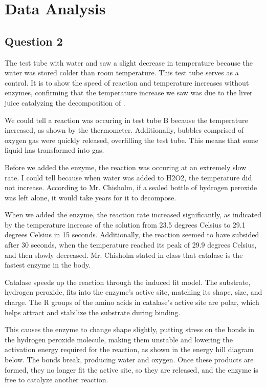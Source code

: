 \documentclass[12pt]{article}
\begin{document}
\section*{Data Analysis}

\subsection*{Question 2}
\begin{enumAlph}
    \item The test tube with water and  saw a slight decrease in temperature
    because the water was stored colder than room temperature. This test tube serves as a control. It is to show
    the speed of reaction and temperature increases without enzymes, 
    confirming that the temperature increase we saw
    was due to the liver juice catalyzing the decomposition of . 
    \item We could tell a reaction was occuring in test tube B 
    because the temperature increased, as shown by the thermometer.
    Additionally, bubbles comprised of oxygen gas were quickly released, overfilling
    the test tube. This means that some liquid has transformed into gas. 
    \item Before we added the enzyme, the reaction was occuring at 
    an extremely slow rate. I could tell because when water was added to H2O2, 
    the temperature did not increase. According to Mr. 
    Chisholm, if a sealed bottle of hydrogen peroxide was left alone,
    it would take years for it to decompose.
    \item When we added the enzyme, the
    reaction rate increased significantly, as indicated by the temperature increase of the solution from 
    23.5 degrees Celsius to 29.1 degrees Celsius in 15 seconds. Additionally, the reaction seemed to have
    subsided after 30 seconds, when the temperature reached its peak of 29.9 degrees Celsius, and then
    slowly decreased. Mr. Chisholm stated in class that catalase is the fastest
    enzyme in the body. 
    \item Catalase speeds up the reaction through the induced fit model. 
    The substrate, hydrogen peroxide, fits into the enzyme's active site, 
    matching its shape, size, and charge. The R groups of the amino acids in catalase’s active site are polar, which helps attract and stabilize the substrate during binding.
    
    This causes the enzyme to change 
    shape slightly, putting stress on the bonds in the hydrogen peroxide 
    molecule, making them unstable and lowering the activation energy 
    required for the reaction, as shown in the energy hill diagram below. The bonds break, producing water and oxygen. 
    Once these products are formed, they no longer fit the active site, 
    so they are released, and the enzyme is free to catalyze another reaction.


\end{enumAlph}
\end{document}
